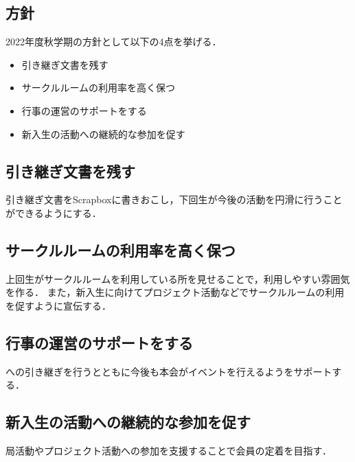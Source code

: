 \subsection*{\newGradeIfKouki{}\thirdGrade{}方針}


2022年度秋学期の\thirdGrade{}方針として以下の4点を挙げる．

\begin{itemize}
    \item 引き継ぎ文書を残す
    \item サークルルームの利用率を高く保つ
    \item 行事の運営のサポートをする
    \item 新入生の活動への継続的な参加を促す
\end{itemize}

\subsection*{引き継ぎ文書を残す}
引き継ぎ文書をScrapboxに書きおこし，下回生が今後の活動を円滑に行うことができるようにする．

\subsection*{サークルルームの利用率を高く保つ}
上回生がサークルルームを利用している所を見せることで，利用しやすい雰囲気を作る．
また，新入生に向けてプロジェクト活動などでサークルルームの利用を促すように宣伝する．

\subsection*{行事の運営のサポートをする}
\secondGrade{}への引き継ぎを行うとともに今後も本会がイベントを行えるよう\secondGrade{}をサポートする．

\subsection*{新入生の活動への継続的な参加を促す}
局活動やプロジェクト活動への参加を支援することで会員の定着を目指す．
